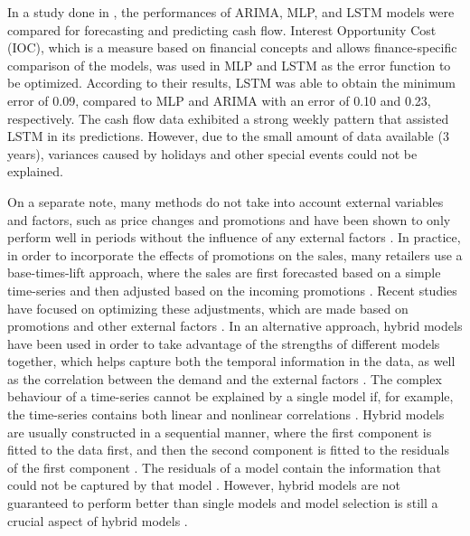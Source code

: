 In a study done in \cite{c11}, the performances of ARIMA, MLP, and LSTM models were compared for forecasting and predicting cash flow.
Interest Opportunity Cost (IOC), which is a measure based on financial concepts and allows finance-specific comparison of the models, was used in MLP and LSTM as the error function to be optimized.
According to their results, LSTM was able to obtain the minimum error of 0.09, compared to MLP and ARIMA with an error of 0.10 and 0.23, respectively.
The cash flow data exhibited a strong weekly pattern that assisted LSTM in its predictions. 
However, due to the small amount of data available (3 years), variances caused by holidays and other special events could not be explained.

On a separate note, many methods do not take into account external variables and factors, such as price changes and promotions and have been shown to only perform well in periods without the influence of any external factors \cite{c2, c3}. 
In practice, in order to incorporate the effects of promotions on the sales, many retailers use a base-times-lift approach, where the sales are first forecasted based on a simple time-series and then adjusted based on the incoming promotions \cite{c4}. 
Recent studies have focused on optimizing these adjustments, which are made based on promotions and other external factors \cite{c4}. 
In an alternative approach, hybrid models have been used in order to take advantage of the strengths of different models together, which helps capture both the temporal information in the data, as well as the correlation between the demand and the external factors \cite{c5, c8}. 
The complex behaviour of a time-series cannot be explained by a single model if, for example, the time-series contains both linear and nonlinear correlations \cite{c12}.
Hybrid models are usually constructed in a sequential manner, where the first component is fitted to the data first, and then the second component is fitted to the residuals of the first component \cite{c12}.
The residuals of a model contain the information that could not be captured by that model \cite{c8}.
However, hybrid models are not guaranteed to perform better than single models and model selection is still a crucial aspect of hybrid models \cite{c12}.

